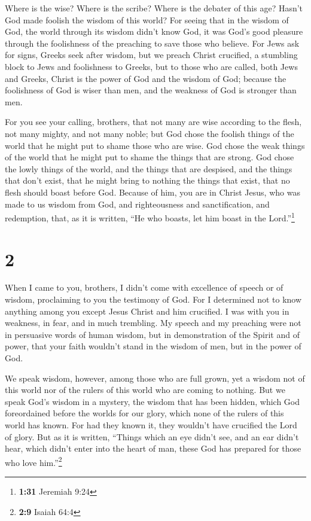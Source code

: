  Where is the wise? Where is the scribe? Where is the
debater of this age? Hasn't God made foolish the wisdom of this world?
 For seeing that in the wisdom of God, the world through
its wisdom didn't know God, it was God's good pleasure through the
foolishness of the preaching to save those who believe. 
For Jews ask for signs, Greeks seek after wisdom,  but we
preach Christ crucified, a stumbling block to Jews and foolishness to
Greeks,  but to those who are called, both Jews and
Greeks, Christ is the power of God and the wisdom of God;
 because the foolishness of God is wiser than men, and
the weakness of God is stronger than men.

 For you see your calling, brothers, that not many are
wise according to the flesh, not many mighty, and not many noble;
 but God chose the foolish things of the world that he
might put to shame those who are wise. God chose the weak things of the
world that he might put to shame the things that are strong.
 God chose the lowly things of the world, and the things
that are despised, and the things that don't exist, that he might bring
to nothing the things that exist,  that no flesh should
boast before God.  Because of him, you are in Christ
Jesus, who was made to us wisdom from God, and righteousness and
sanctification, and redemption,  that, as it is written,
``He who boasts, let him boast in the Lord.''\footnote{\textbf{1:31}
  Jeremiah 9:24}

\hypertarget{section-1}{%
\section{2}\label{section-1}}

 When I came to you, brothers, I didn't come with
excellence of speech or of wisdom, proclaiming to you the testimony of
God.  For I determined not to know anything among you
except Jesus Christ and him crucified.  I was with you in
weakness, in fear, and in much trembling.  My speech and
my preaching were not in persuasive words of human wisdom, but in
demonstration of the Spirit and of power,  that your faith
wouldn't stand in the wisdom of men, but in the power of God.

 We speak wisdom, however, among those who are full grown,
yet a wisdom not of this world nor of the rulers of this world who are
coming to nothing.  But we speak God's wisdom in a
mystery, the wisdom that has been hidden, which God foreordained before
the worlds for our glory,  which none of the rulers of
this world has known. For had they known it, they wouldn't have
crucified the Lord of glory.  But as it is written,
``Things which an eye didn't see, and an ear didn't hear, which didn't
enter into the heart of man, these God has prepared for those who love
him.''\footnote{\textbf{2:9} Isaiah 64:4}

